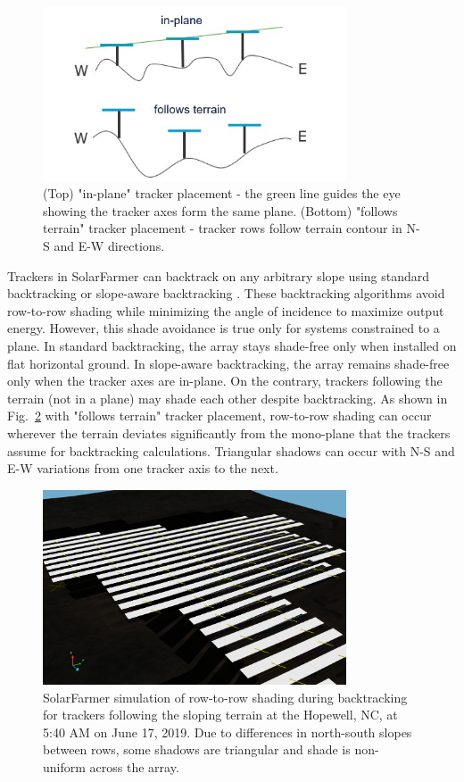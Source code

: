 \documentclass[conference]{IEEEtran}
\begin{document}
\begin{figure}[htbp]
\centerline{\includegraphics[width=9cm]{tracker-placement.jpg}}
\caption{(Top) "in-plane" tracker placement - the green line guides the eye showing the tracker axes form the same plane. (Bottom) "follows terrain" tracker placement - tracker rows follow terrain contour in N-S and E-W directions.}
\label{tracker-placement}
\end{figure}

Trackers in SolarFarmer can backtrack on any arbitrary slope using standard backtracking or slope-aware backtracking \cite{Anderson2020}. These backtracking algorithms avoid row-to-row shading while minimizing the angle of incidence to maximize output energy. However, this shade avoidance is true only for systems constrained to a plane. In standard backtracking, the array stays shade-free only when installed on flat horizontal ground. In slope-aware backtracking, the array remains shade-free only when the tracker axes are in-plane. On the contrary, trackers following the terrain (not in a plane) may shade each other despite backtracking. As shown in Fig.~\ref{terrain-shade} with "follows terrain" tracker placement, row-to-row shading can occur wherever the terrain deviates significantly from the mono-plane that the trackers assume for backtracking calculations. Triangular shadows can occur with N-S and E-W variations from one tracker axis to the next. 

\begin{figure}[htbp]
\centerline{\includegraphics[width=9cm]{Hopewell-Friends-SolarFarmer-shade-follows-std.png}}
\caption{SolarFarmer simulation of row-to-row shading during backtracking for trackers following the sloping terrain at the Hopewell, NC, at 5:40 AM on June 17, 2019. Due to differences in north-south slopes between rows, some shadows are triangular and shade is non-uniform across the array.}
\label{terrain-shade}
\end{figure}
\end{document}
